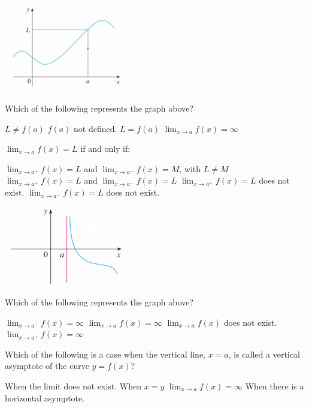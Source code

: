 \documentclass[addpoints, 12pt]{exam}%
\newcommand{\spc}{\vspace*{0.5cm}}
\begin{document}
\begin{questions}
\question[1]
\includegraphics[width=0.4\textwidth]{241-limit case 2.png}

Which of the following represents the graph above?

\begin{choices}
\CorrectChoice $L \neq f(a)$
\choice $f(a)$ not defined.
\choice $L = f(a)$
\choice $\lim_{x \to a} f(x) = \infty$
\end{choices}

\spc

\question[1]
$\lim_{x \to a} f(x) = L$ if and only if:

\begin{choices}
\choice $\lim_{x \to a^+} f(x) = L$ and $\lim_{x \to a^-} f(x) = M$, with $L \neq M$
\CorrectChoice $\lim_{x \to a^+} f(x) = L$ and $\lim_{x \to a^-} f(x) = L$
\choice $\lim_{x \to a^+} f(x) = L$ does not exist.
\choice $\lim_{x \to a^-} f(x) = L$ does not exist.
\end{choices}

\spc

\question[1]
\includegraphics[width=0.4\textwidth]{241-infinite limits.png}

Which of the following represents the graph above?

\begin{choices}
\choice $\lim_{x \to a^-} f(x) = \infty$
\choice $\lim_{x \to a} f(x) = \infty$
\choice $\lim_{x \to a} f(x)$ does not exist.
\CorrectChoice $\lim_{x \to a^+} f(x) = \infty$
\end{choices}


\question[1]
Which of the following is a case when the vertical line, $x = a$, is called a vertical asymptote of the curve $y = f(x)$?

\begin{choices}
\choice When the limit does not exist. 
\choice When $x = y$
\CorrectChoice $\lim_{x \to a} f(x) = \infty$
\choice When there is a horizontal asymptote.
\end{choices}



\end{questions}
\end{document}
